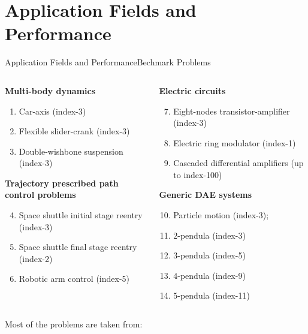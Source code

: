 
\section{Application Fields and Performance}

\begin{frame}{Application Fields and Performance}{Bechmark Problems}
  \begin{columns}
    \begin{column}[t]{0.575\textwidth}
      \textbf{Multi-body dynamics}
      \begin{enumerate}\small
        \setlength{\itemsep}{0.0em}
        \item Car-axis (index-3)
        \item Flexible slider-crank (index-3)
        \item Double-wishbone suspension (index-3)
      \end{enumerate}
      \textbf{Trajectory prescribed path control problems}
      \begin{enumerate}\setcounter{enumi}{3}\small
        \setlength{\itemsep}{0.0em}
        \item Space shuttle initial stage reentry (index-3)
        \item Space shuttle final stage reentry (index-2)
        \item Robotic arm control  (index-5)
      \end{enumerate}
    \end{column}
    \hspace{-0.055\textwidth}
    \begin{column}[t]{0.55\textwidth}
      \textbf{Electric circuits}
      \begin{enumerate}\setcounter{enumi}{6}\small
        \setlength{\itemsep}{0.0em}
        \item Eight-nodes transistor-amplifier (index-3)
        \item Electric ring modulator (index-1)
        \item Cascaded differential amplifiers (up to index-100)
      \end{enumerate}
      \textbf{Generic \acs{DAE} systems}
      \begin{enumerate}\setcounter{enumi}{9}\small
        \setlength{\itemsep}{0.0em}
        \item Particle motion (index-3);
        \item $2$-pendula (index-3)
        \item $3$-pendula (index-5)
        \item $4$-pendula (index-9)
        \item $5$-pendula (index-11)
      \end{enumerate}
    \end{column}
  \end{columns}
  \vspace{1.0em}
  \scriptsize{Most of the problems are taken from: \\
   \\
  }
\end{frame}


